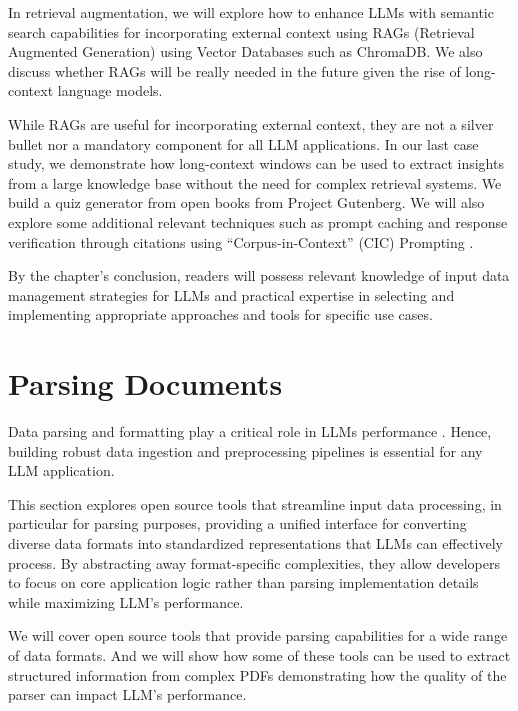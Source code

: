 In retrieval augmentation, we will explore how to enhance LLMs with semantic search capabilities for incorporating external context using RAGs (Retrieval Augmented Generation) using Vector Databases such as ChromaDB. We also discuss whether RAGs will be really needed in the future given the rise of long-context language models.

While RAGs are useful for incorporating external context, they are not a silver bullet nor a mandatory component for all LLM applications. In our last case study, we demonstrate how long-context windows can be used to extract insights from a large knowledge base without the need for complex retrieval systems. We build a quiz generator from open books from Project Gutenberg. We will also explore some additional relevant techniques such as prompt caching and response verification through citations using ``Corpus-in-Context'' (CIC) Prompting .

By the chapter's conclusion, readers will possess relevant knowledge of input data management strategies for LLMs and practical expertise in selecting and implementing appropriate approaches and tools for specific use cases.
\section{Parsing Documents}
\label{parsing}

Data parsing and formatting play a critical role in LLMs performance . Hence, building robust data ingestion and preprocessing pipelines is essential for any LLM application.

This section explores open source tools that streamline input data processing, in particular for parsing purposes, providing a unified interface for converting diverse data formats into standardized representations that LLMs can effectively process. By abstracting away format-specific complexities, they allow developers to focus on core application logic rather than parsing implementation details while maximizing LLM's performance.

We will cover open source tools that provide parsing capabilities for a wide range of data formats. And we will show how some of these tools can be used to extract structured information from complex PDFs demonstrating how the quality of the parser can impact LLM's performance.

